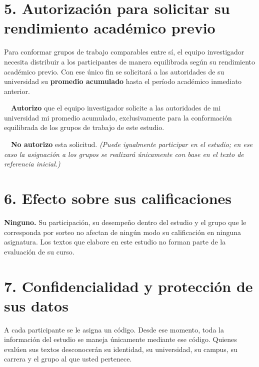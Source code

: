\documentclass[12pt,a4paper,openany]{report}
\begin{document}
    \section*{5. Autorizaci\'on para solicitar su rendimiento acad\'emico previo}
    
    Para conformar grupos de trabajo comparables entre s\'i, el equipo investigador necesita distribuir a los participantes de manera equilibrada seg\'un su rendimiento acad\'emico previo. Con ese \'unico fin se solicitar\'a a las autoridades de su universidad su \textbf{promedio acumulado} hasta el per\'iodo acad\'emico inmediato anterior.
    
    \vspace{4pt}
    \fbox{\phantom{x}}\ \ \textbf{Autorizo} que el equipo investigador solicite a las autoridades de mi universidad mi promedio acumulado, exclusivamente para la conformaci\'on equilibrada de los grupos de trabajo de este estudio.
    
    \vspace{4pt}
    \fbox{\phantom{x}}\ \ \textbf{No autorizo} esta solicitud. \textit{(Puede igualmente participar en el estudio; en ese caso la asignaci\'on a los grupos se realizar\'a \'unicamente con base en el texto de referencia inicial.)}
    
    \section*{6. Efecto sobre sus calificaciones}
    
    \textbf{Ninguno.} Su participaci\'on, su desempe\~no dentro del estudio y el grupo que le corresponda por sorteo no afectan de ning\'un modo su calificaci\'on en ninguna asignatura. Los textos que elabore en este estudio no forman parte de la evaluaci\'on de su curso.
    
    \section*{7. Confidencialidad y protecci\'on de sus datos}
    
    A cada participante se le asigna un c\'odigo. Desde ese momento, toda la informaci\'on del estudio se maneja \'unicamente mediante ese c\'odigo. Quienes eval\'uen sus textos desconocer\'an su identidad, su universidad, su campus, su carrera y el grupo al que usted pertenece.
    
\end{document}
